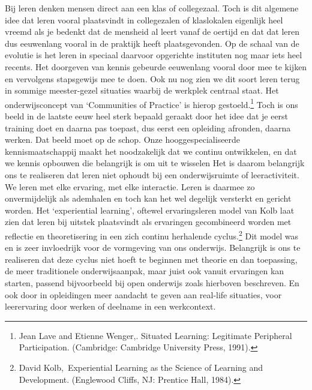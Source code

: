 \documentclass[empirical, authordate, ]{new-jote-article}
\begin{document}
	Bij leren denken mensen direct aan een klas of collegezaal. Toch is dit algemene idee dat leren vooral plaatsvindt in collegezalen of klaslokalen eigenlijk heel vreemd als je bedenkt dat de mensheid al leert vanaf de oertijd en dat dat leren dus eeuwenlang vooral in de praktijk heeft plaatsgevonden. Op de schaal van de evolutie is het leren in speciaal daarvoor opgerichte instituten nog maar iets heel recents. Het doorgeven van kennis gebeurde eeuwenlang vooral door mee te kijken en vervolgens stapsgewijs mee te doen. Ook nu nog zien we dit soort leren terug in sommige meester-gezel situaties waarbij de werkplek centraal staat. Het onderwijsconcept van ‘Communities of Practice' is hierop gestoeld.\footnote{Jean Lave and Etienne Wenger,. Situated Learning: Legitimate Peripheral Participation. (Cambridge: Cambridge University Press, 1991). } Toch is ons beeld in de laatste eeuw heel sterk bepaald geraakt door het idee dat je eerst training doet en daarna pas toepast, dus eerst een opleiding afronden, daarna werken. Dat beeld moet op de schop. Onze hooggespecialiseerde kennismaatschappij maakt het noodzakelijk dat we continu ontwikkelen, en dat we kennis opbouwen die belangrijk is om uit te wisselen Het is daarom belangrijk ons te realiseren dat leren niet ophoudt bij een onderwijsruimte of leeractiviteit. We leren met elke ervaring, met elke interactie. Leren is daarmee zo onvermijdelijk als ademhalen en toch kan het wel degelijk versterkt en gericht worden. Het ‘experiential learning', oftewel ervaringsleren model van Kolb laat zien dat leren bij uitstek plaatsvindt als ervaringen gecombineerd worden met reflectie en theoretisering in een zich continu herhalende cyclus.\footnote{David Kolb, Experiential Learning as the Science of Learning and Development. (Englewood Cliffs, NJ: Prentice Hall, 1984).} Dit model was en is zeer invloedrijk voor de vormgeving van ons onderwijs. Belangrijk is ons te realiseren dat deze cyclus niet hoeft te beginnen met theorie en dan toepassing, de meer traditionele onderwijsaanpak, maar juist ook vanuit ervaringen kan starten, passend bijvoorbeeld bij open onderwijs zoals hierboven beschreven. En ook door in opleidingen meer aandacht te geven aan real-life situaties, voor leerervaring door werken of deelname in een werkcontext.
\end{document}
